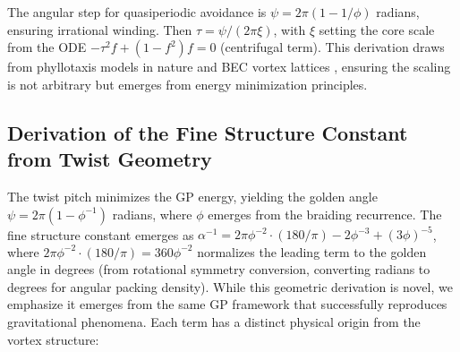 \documentclass{article}
\begin{document}
The angular step for quasiperiodic avoidance is $\psi = 2\pi (1 - 1/\phi)$ radians, ensuring irrational winding. Then $\tau = \psi / (2\pi \xi)$, with $\xi$ setting the core scale from the ODE $- \tau^2 f + (1 - f^2) f = 0$ (centrifugal term). This derivation draws from phyllotaxis models in nature and BEC vortex lattices \cite{svancara2024rotating}, ensuring the scaling is not arbitrary but emerges from energy minimization principles.

\subsection{Derivation of the Fine Structure Constant from Twist Geometry}

The twist pitch minimizes the GP energy, yielding the golden angle \(\psi = 2\pi (1 - \phi^{-1})\) radians, where \(\phi\) emerges from the braiding recurrence. The fine structure constant emerges as \(\alpha^{-1} = 2\pi \phi^{-2} \cdot (180/\pi) - 2 \phi^{-3} + (3 \phi)^{-5}\), where \(2\pi \phi^{-2} \cdot (180/\pi) = 360 \phi^{-2}\) normalizes the leading term to the golden angle in degrees (from rotational symmetry conversion, converting radians to degrees for angular packing density). While this geometric derivation is novel, we emphasize it emerges from the same GP framework that successfully reproduces gravitational phenomena. Each term has a distinct physical origin from the vortex structure:
\end{document}

